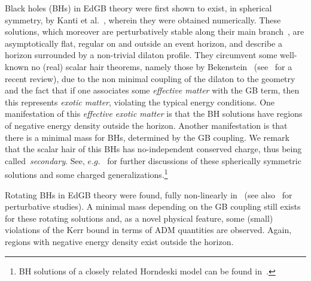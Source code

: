 \documentclass[12pt]{article}
\begin{document}
Black holes (BHs) in EdGB theory were first shown to exist, in spherical symmetry, by Kanti et al.~\cite{Kanti:1995vq}, wherein they were obtained numerically. These solutions, which moreover are perturbatively stable along their main branch~\cite{Kanti:1997br}, are asymptotically flat, regular on and outside an event horizon, and describe a horizon surrounded by a non-trivial dilaton profile. They circumvent some well-known no (real) scalar hair theorems, namely those by Bekenstein~\cite{Bekenstein:1972ny,Bekenstein:1995un} (see~\cite{Herdeiro:2015waa} for a recent review), due to the non minimal coupling of the dilaton to the geometry 
and the fact that if one associates some \textit{effective matter} with the GB term, then this represents \textit{exotic matter}, violating the typical energy conditions. One manifestation of this \textit{effective exotic matter} is that the BH solutions have regions of negative energy density outside the horizon. Another manifestation is that there is a minimal mass for BHs, determined by the GB coupling. We remark that the scalar hair of this BHs has no-independent conserved charge, thus being called~\textit{secondary}. See, $e.g.$~\cite{Torii:1996yi,Alexeev:1996vs,Melis:2005ji,Chen:2006ge,Chen:2008hk} for further discussions of these spherically symmetric solutions and some charged generalizations.\footnote{BH solutions of a closely related Horndeski model can be found in~\cite{Sotiriou:2013qea,Sotiriou:2014pfa}.}






\bigskip

Rotating BHs in EdGB theory were found, fully non-linearly in~\cite{Kleihaus:2011tg,Kleihaus:2015aje} (see also~\cite{Pani:2009wy,Pani:2011gy, Ayzenberg:2014aka, Maselli:2015tta} for perturbative studies). A minimal mass depending on the GB coupling still exists for these rotating solutions and, as a novel physical feature, some (small) violations of the Kerr bound in terms of ADM quantities are observed. Again, regions with negative energy density exist outside the horizon.

\bigskip
\end{document}
